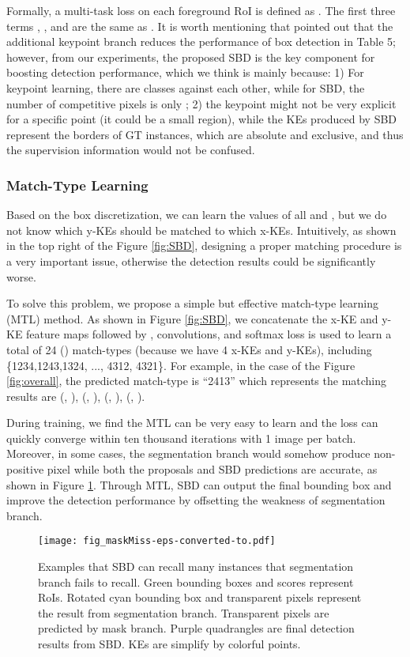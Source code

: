 \documentclass{article}
\begin{document}
Formally, a multi-task loss on each foreground RoI is defined as . The first three terms , , and  are the same as \cite{he2017mask}. 
It is worth mentioning that \cite{he2017mask} pointed out that the additional keypoint branch reduces the performance of box detection in Table 5; however, from our experiments, the proposed SBD is the key component for boosting detection performance, which we think is mainly because: 1) For keypoint learning, there are  classes against each other, while for SBD, the number of competitive pixels is only ; 2) the keypoint might not be very explicit for a specific point (it could be a small region), while the KEs produced by SBD represent the borders of GT instances, which are absolute and exclusive, and thus the supervision information would not be confused.

\subsubsection{Match-Type Learning}
Based on the box discretization, we can learn the values of all  and , but we do not know which y-KEs should be matched to which x-KEs. Intuitively, as shown in the top right of the Figure \ref{fig:SBD}, designing a proper matching procedure is a very important issue, otherwise the detection results could be significantly worse.

To solve this problem, we propose a simple but effective match-type learning (MTL) method. As shown in Figure \ref{fig:SBD}, we concatenate the x-KE and y-KE feature maps followed by ,  convolutions, and softmax loss is used to learn a total of 24 () match-types (because we have 4 x-KEs and y-KEs), including \{1234,1243,1324, ..., 4312, 4321\}. For example, in the case of the Figure \ref{fig:overall}, the predicted match-type is ``2413'' which represents the matching results are (, ), (, ), (, ), (, ). 

During training, we find the MTL can be very easy to learn and the loss can quickly converge within ten thousand iterations with 1 image per batch. Moreover, in some cases, the segmentation branch would somehow produce non-positive pixel while both the proposals and SBD predictions are accurate, as shown in Figure \ref{fig:maskMiss}. Through MTL, SBD can output the final bounding box and improve the detection performance by offsetting the weakness of segmentation branch. 

\begin{figure}[!t]
  \centering
  \centerline{\texttt{[image: fig\_maskMiss-eps-converted-to.pdf]}}
  \caption{Examples that SBD can recall many instances that segmentation branch fails to recall. Green bounding boxes and scores represent RoIs. Rotated cyan bounding box and transparent pixels represent the result from segmentation branch. Transparent pixels are predicted by mask branch. Purple quadrangles are final detection results from SBD. KEs are simplify by colorful points.}\label{fig:maskMiss}
\end{figure}
\end{document}
